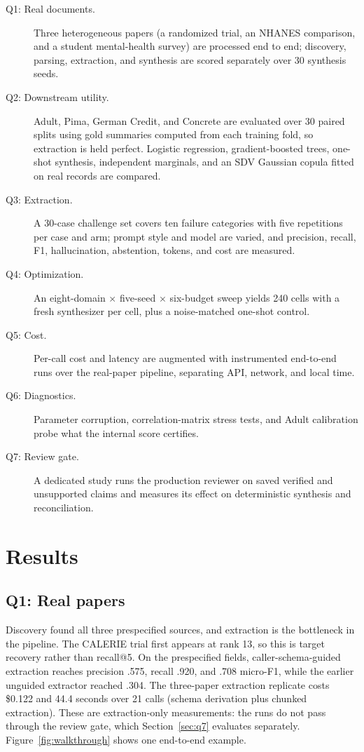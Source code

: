 \documentclass[letterpaper]{article}
\begin{document}
\begin{description}
\item[Q1: Real documents.] Three heterogeneous papers (a randomized trial, an NHANES comparison,
  and a student mental-health survey) are processed end to end; discovery, parsing, extraction,
  and synthesis are scored separately over 30 synthesis seeds.
\item[Q2: Downstream utility.] Adult, Pima, German Credit, and Concrete are evaluated over 30
  paired splits using gold summaries computed from each training fold, so extraction is held
  perfect. Logistic regression, gradient-boosted trees, one-shot synthesis, independent
  marginals, and an SDV Gaussian copula fitted on real records are compared.
\item[Q3: Extraction.] A 30-case challenge set covers ten failure categories with five
  repetitions per case and arm; prompt style and model are varied, and precision, recall, F1,
  hallucination, abstention, tokens, and cost are measured.
\item[Q4: Optimization.] An eight-domain $\times$ five-seed $\times$ six-budget sweep yields 240
  cells with a fresh synthesizer per cell, plus a noise-matched one-shot control.
\item[Q5: Cost.] Per-call cost and latency are augmented with instrumented end-to-end runs over
  the real-paper pipeline, separating API, network, and local time.
\item[Q6: Diagnostics.] Parameter corruption, correlation-matrix stress tests, and Adult
  calibration probe what the internal score certifies.
\item[Q7: Review gate.] A dedicated study runs the production reviewer on saved verified and
  unsupported claims and measures its effect on deterministic synthesis and reconciliation.
\end{description}

\section{Results}
\label{sec:results}

\subsection{Q1: Real papers}
\label{sec:q1}

Discovery found all three prespecified sources, and extraction is the bottleneck in the pipeline.
The CALERIE trial first appears at rank 13, so this is target recovery rather than recall@5. On
the prespecified fields, caller-schema-guided extraction reaches precision .575, recall .920,
and .708 micro-F1, while the earlier unguided extractor reached .304. The three-paper extraction
replicate costs \$0.122 and 44.4 seconds over 21 calls (schema derivation plus chunked
extraction). These are extraction-only measurements: the runs do not pass through the review
gate, which Section~\ref{sec:q7} evaluates separately. Figure~\ref{fig:walkthrough} shows one
end-to-end example.
\end{document}
